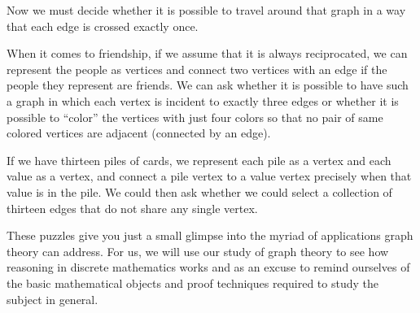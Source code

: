 \documentclass[10pt,]{book}
\theoremstyle{plain}
\theoremstyle{definition}
\theoremstyle{definition}
\theoremstyle{definition}
\numberwithin{equation}{chapter}
\begin{document}
\par
\hypertarget{p-19}{}%
Now we must decide whether it is possible to travel around that graph in a way that each edge is crossed exactly once.%
\par
\hypertarget{p-20}{}%
When it comes to friendship, if we assume that it is always reciprocated, we can represent the people as vertices and connect two vertices with an edge if the people they represent are friends.  We can ask whether it is possible to have such a graph in which each vertex is incident to exactly three edges or whether it is possible to ``color'' the vertices with just four colors so that no pair of same colored vertices are adjacent (connected by an edge).%
\par
\hypertarget{p-21}{}%
If we have thirteen piles of cards, we represent each pile as a vertex and each value as a vertex, and connect a pile vertex to a value vertex precisely when that value is in the pile.  We could then ask whether we could select a collection of thirteen edges that do not share any single vertex.%
\par
\hypertarget{p-22}{}%
These puzzles give you just a small glimpse into the myriad of applications graph theory can address.  For us, we will use our study of graph theory to see how reasoning in discrete mathematics works and as an excuse to remind ourselves of the basic mathematical objects and proof techniques required to study the subject in general.%
\typeout{************************************************}
\typeout{************************************************}
\end{document}
